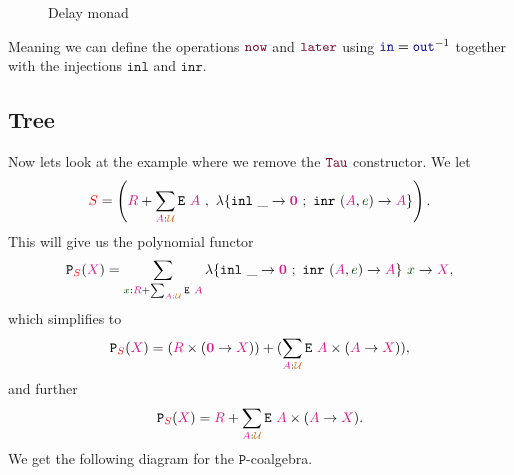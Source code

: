 \documentclass[twoside,11pt,openright]{report}
\theoremstyle{plain} %
\theoremstyle{definition}
\theoremstyle{remark}
\newcommand*{\term}[1]{\textcolor{green!30!black}{#1}} %
\newcommand*{\type}[1]{\textcolor{magenta!90!black}{#1}}
\newcommand*{\container}[1]{\textcolor{red}{#1}}
\newcommand*{\universe}[1]{\textcolor{orange!80!black}{#1}}
\newcommand*{\empt}{\type{\textbf{0}}}
\newcommand*{\function}[1]{\textcolor{blue!60!black}{\ensuremath{\mathtt{#1}}}}
\newcommand*{\constructor}[1]{\textcolor{purple!60!black}{\ensuremath{\mathtt{#1}}}}
\newcommand*{\typeformer}[1]{\ensuremath{\mathtt{#1}}}
\newcommand*{\functor}[1]{\ensuremath{\mathbf{\mathtt{#1}}}}
\begin{document}
\begin{figure}[h]
  \centering
  \caption{Delay monad}
\end{figure}
\noindent Meaning we can define the operations \(\constructor{now}\) and \(\constructor{later}\) using \(\function{in} = \function{out}^{-1}\) together with the injections \(\mathtt{inl}\) and \(\mathtt{inr}\). 

\subsection{Tree}
Now lets look at the example where we remove the \(\constructor{Tau}\) constructor. We let
\begin{equation}
  \container{S} = \left(\type{R} + \sum_{\type{A} : \universe{\mathcal{U}}} \typeformer{E}~\type{A}~,~\lambda \{ \texttt{inl}~\_ \rightarrow \empt ~;~ \texttt{inr}~(\type{A},\term{e}) \rightarrow \type{A} \} \right).
\end{equation}
This will give us the polynomial functor
\begin{equation}
  \functor{P}_{\container{S}}(\type{X}) = \sum_{\term{x} : \type{R} + \sum_{\type{A} : \universe{\mathcal{U}}} \typeformer{E}~\type{A}} \lambda \{ \texttt{inl}~\_ \rightarrow \empt ~;~ \texttt{inr}~(\type{A},\term{e}) \rightarrow \type{A} \}~\term{x} \rightarrow \type{X},
\end{equation}
which simplifies to
\begin{equation}
  \functor{P}_{\container{S}}(\type{X}) = (\type{R} \times (\empt \rightarrow \type{X})) + (\sum_{\type{A} : \universe{\mathcal{U}}} \typeformer{E}~\type{A} \times (\type{A} \rightarrow \type{X})),
\end{equation}
and further
\begin{equation}
  \functor{P}_{\container{S}}(\type{X}) = \type{R} + \sum_{\type{A} : \universe{\mathcal{U}}} \typeformer{E}~\type{A} \times (\type{A} \rightarrow \type{X}).
\end{equation}
We get the following diagram for the \(\functor{P}\)-coalgebra.
\end{document}
